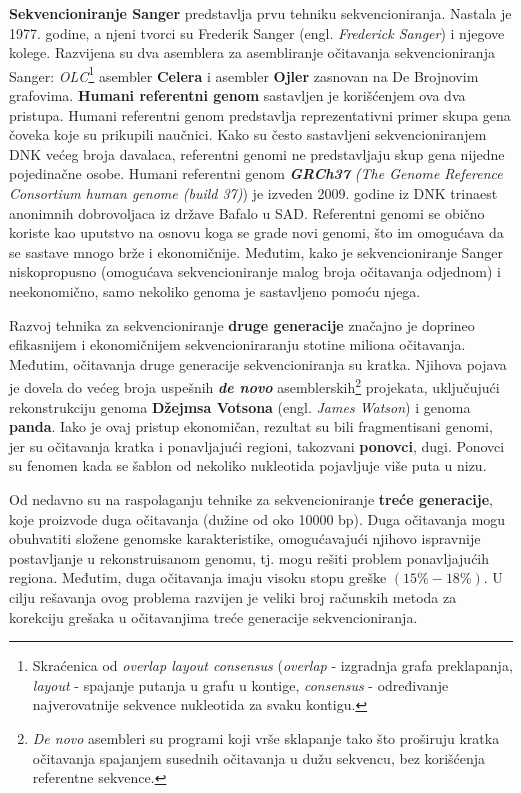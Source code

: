 \documentclass[12pt,oneside]{memoir}
\begin{document}
\textbf{Sekvencioniranje Sanger} predstavlja prvu tehniku sekvencioniranja. Nastala je 1977. godine, a njeni tvorci su Frederik Sanger (engl. \textit{Frederick Sanger}) i njegove kolege. Razvijena su dva asemblera za asembliranje očitavanja sekvencioniranja Sanger: \textit{OLC}\footnote{Skraćenica od \textit{overlap layout consensus} (\textit{overlap} - izgradnja grafa preklapanja,
\textit{layout} - spajanje putanja u grafu u kontige, \textit{consensus} - određivanje najverovatnije sekvence
nukleotida za svaku kontigu.} asembler \textbf{Celera} i asembler \textbf{Ojler} zasnovan na De Brojnovim grafovima. \textbf{Humani referentni genom} sastavljen je korišćenjem ova dva pristupa. Humani referentni genom predstavlja reprezentativni primer skupa gena čoveka koje su prikupili naučnici. Kako su često sastavljeni sekvencioniranjem DNK većeg broja davalaca, referentni genomi ne predstavljaju skup gena nijedne pojedinačne osobe. Humani referentni genom \textit{\textbf{GRCh37}} \textit{(The Genome Reference Consortium human genome (build 37)}) je izveden 2009. godine iz DNK trinaest anonimnih dobrovoljaca iz države Bafalo u SAD. Referentni genomi se obično koriste kao uputstvo na osnovu koga se grade novi genomi, što im omogućava da se sastave mnogo brže i ekonomičnije. Međutim, kako je sekvencioniranje Sanger niskopropusno (omogućava sekvencioniranje malog broja očitavanja odjednom) i neekonomično, samo nekoliko genoma je sastavljeno pomoću njega.

Razvoj tehnika za sekvencioniranje \textbf{druge generacije} značajno je doprineo efikasnijem i ekonomičnijem sekvencioniraranju stotine miliona očitavanja. Međutim, očitavanja druge generacije sekvencioniranja su kratka. Njihova pojava je dovela do većeg broja uspešnih \textbf{\textit{de novo}} asemblerskih\footnote{\textit{De novo} asembleri su programi
koji vrše sklapanje tako što proširuju kratka očitavanja spajanjem susednih
očitavanja u dužu sekvencu, bez korišćenja referentne sekvence.} projekata, uključujući rekonstrukciju genoma \textbf{Džejmsa Votsona} (engl. \textit{James Watson}) i genoma \textbf{panda}. Iako je ovaj pristup ekonomičan, rezultat su bili fragmentisani genomi, jer su očitavanja kratka i ponavljajući regioni, takozvani \textbf{ponovci}, dugi. Ponovci su fenomen kada se šablon od nekoliko nukleotida pojavljuje više puta u nizu.

Od nedavno su na raspolaganju tehnike za sekvencioniranje \textbf{treće generacije}, koje proizvode duga očitavanja (dužine od oko 10000 bp). Duga očitavanja mogu obuhvatiti složene genomske karakteristike, omogućavajući njihovo ispravnije postavljanje u rekonstruisanom genomu, tj. mogu rešiti problem ponavljajućih regiona. Međutim, duga očitavanja imaju visoku stopu greške $(15\%-18\%)$. U cilju rešavanja ovog problema razvijen je veliki broj računskih metoda za korekciju grešaka u očitavanjima treće generacije sekvencioniranja.
\end{document}

